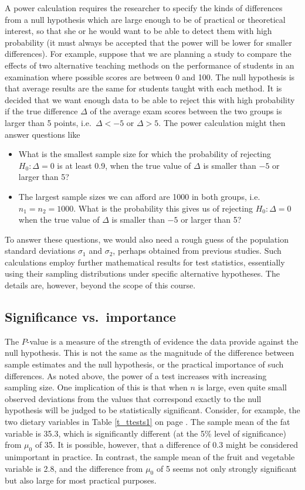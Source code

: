 A power calculation requires the researcher to specify the kinds of
differences from a null hypothesis which are large enough to be of
practical or theoretical interest, so that she or he would want to be
able to detect them with high probability (it must always be accepted
that the power will be lower for smaller differences). For example,
suppose that we are planning a study to compare the effects of two
alternative teaching methods on the performance of students in an
examination where possible scores are between 0 and 100.
The null hypothesis is that average results are the same for students
taught with each method.
It is decided
that we want enough data to be able to reject this with high probability
if the true difference $\Delta$ of
the average exam scores between the two groups
is larger than 5
points, i.e.\ $\Delta<-5$ or $\Delta>5$.
The power calculation might then
answer questions like
\begin{itemize}
\item
What is the smallest sample size for which the probability of rejecting
$H_{0}: \Delta=0$ is at least 0.9,
when the true value of $\Delta$ is smaller than $-5$ or
larger than 5?
\item
The largest sample sizes we can afford are 1000 in both groups, i.e.\
$n_{1}=n_{2}=1000$. What is the probability this gives us of rejecting
$H_{0}: \Delta=0$ when the true value of $\Delta$ is smaller than $-5$
or larger than 5?
\end{itemize}
To answer these questions, we would also need a rough guess of the
population standard deviations $\sigma_{1}$ and $\sigma_{2}$, perhaps
obtained from previous studies. Such calculations employ further
mathematical results for test statistics, essentially using their
sampling distributions under specific alternative hypotheses. The
details are, however, beyond the scope of this course.

\subsection{Significance vs.\ importance}
\label{ss_means_tests3_importance}

The $P$-value is a measure of the strength of evidence the data provide
against the null hypothesis. This is not the same as the magnitude of
the difference between sample estimates and the null hypothesis, or
the practical importance of such differences. As noted above, the power of a
test increases with increasing sampling size. One implication of this is
that when $n$ is large, even quite small observed deviations from the
values that correspond exactly to the null hypothesis will be judged to
be statistically significant. Consider, for example, the two dietary
variables in Table
\ref{t_ttests1} on page
\pageref{t_ttests1}.
The sample mean of the fat variable is 35.3, which is significantly
different (at the 5\% level of significance) from $\mu_{0}$ of 35. It is
possible, however, that a difference of 0.3 might be considered
unimportant in practice. In contrast, the sample mean of the fruit and
vegetable variable is 2.8, and the difference from $\mu_{0}$ of 5 seems
not only strongly significant but also large for most practical
purposes.

